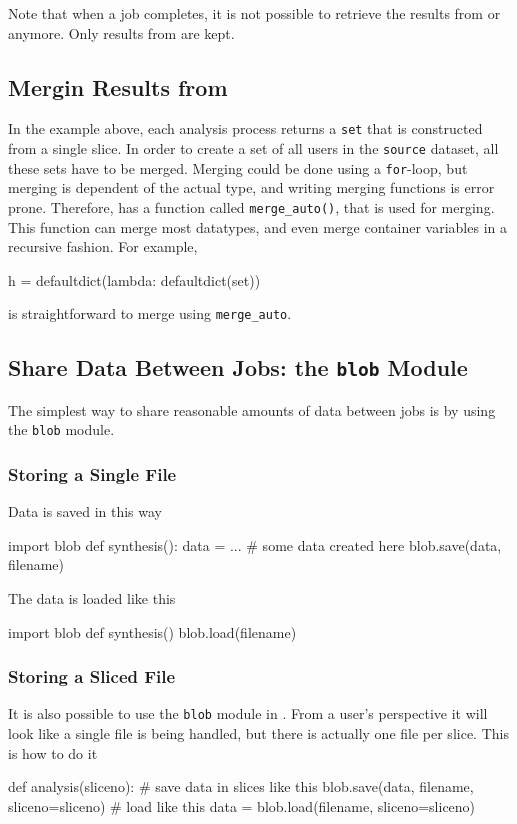 Note that when a job completes, it is not possible to retrieve the
results from \prepare or \analysis anymore.  Only results from
\synthesis are kept.

\subsection{Mergin Results from \analysis}
In the example above, each analysis process returns a \texttt{set}
that is constructed from a single slice.  In order to create a set of
all users in the \texttt{source} dataset, all these sets have to be
merged.  Merging could be done using a \texttt{for}-loop, but merging
is dependent of the actual type, and writing merging functions is
error prone.  Therefore, \analysisres has a function called
\texttt{merge\_auto()}, that is used for merging.  This function can
merge most datatypes, and even merge container variables in a
recursive fashion.  For example,
\begin{python}
h = defaultdict(lambda: defaultdict(set))
\end{python}
is straightforward to merge using \texttt{merge\_auto}.


\subsection{Share Data Between Jobs:  the \texttt{blob} Module}

The simplest way to share reasonable amounts of data between jobs is by using the
\texttt{blob} module.

\subsubsection*{Storing a  Single File}
Data is saved in this way
\begin{python}
import blob
def synthesis():
    data = ...  # some data created here
    blob.save(data, filename)
\end{python}
The data is loaded like this
\begin{python}
import blob
def synthesis()
    blob.load(filename)
\end{python}

\subsubsection*{Storing a Sliced File}
It is also possible to use the \texttt{blob} module in \analysis.
From a user's perspective it will look like a single file is being
handled, but there is actually one file per slice.  This is how to do
it
\begin{python}
def analysis(sliceno):
    # save data in slices like this
    blob.save(data, filename, sliceno=sliceno)
    # load like this
    data = blob.load(filename, sliceno=sliceno)
\end{python}

